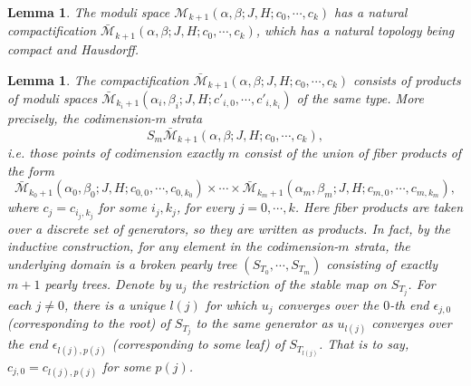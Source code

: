 \documentclass{amsart}
\newtheorem{lemma}[theorem]{Lemma}
\numberwithin{equation}{section}
\numberwithin{figure}{section}
\begin{document}
\begin{lemma}\label{compactness and Hausdorffness}
	The moduli space $\mathcal{M}_{k+1}(\alpha, \beta; J, H; c_{0}, \cdots, c_{k})$ has a natural compactification $\bar{\mathcal{M}}_{k+1}(\alpha, \beta; J, H; c_{0}, \cdots, c_{k})$, which has a natural topology being compact and Hausdorff.
\end{lemma}

\begin{lemma}\label{boundary strata in the moduli space}
	The compactification $\bar{\mathcal{M}}_{k+1}(\alpha, \beta; J, H; c_{0}, \cdots, c_{k})$ consists of products of moduli spaces $\bar{\mathcal{M}}_{k_{i}+1}(\alpha_{i}, \beta_{i}; J, H; c'_{i, 0}, \cdots, c'_{i, k_{i}})$ of the same type. More precisely, the codimension-$m$ strata 
\begin{equation*}
	S_{m}\bar{\mathcal{M}}_{k+1}(\alpha, \beta; J, H; c_{0}, \cdots, c_{k}),
\end{equation*}
i.e. those points of codimension exactly $m$ consist of the union of fiber products of the form 
\begin{equation}\label{boundary strata of moduli space of pearly trees in the form of fiber products}
\bar{\mathcal{M}}_{k_{0}+1}(\alpha_{0}, \beta_{0}; J, H; c_{0, 0}, \cdots, c_{0, k_{0}}) \times \cdots \times \bar{\mathcal{M}}_{k_{m}+1}(\alpha_{m}, \beta_{m}; J, H; c_{m, 0}, \cdots, c_{m, k_{m}}),
\end{equation}
where $c_{j} = c_{i_{j}, k_{j}}$ for some $i_{j}, k_{j}$, for every $j = 0, \cdots, k$. Here fiber products are taken over a discrete set of generators, so they are written as products.
In fact, by the inductive construction, for any element in the codimension-$m$ strata, the underlying domain is a broken pearly tree $(S_{T_{0}}, \cdots, S_{T_{m}})$ consisting of exactly $m+1$ pearly trees. Denote by $u_{j}$ the restriction of the stable map on $S_{T_{j}}$. For each $j \neq 0$, there is a unique $l(j)$ for which $u_{j}$ converges over the $0$-th end $\epsilon_{j, 0}$ (corresponding to the root) of $S_{T_{j}}$ to the same generator as $u_{l(j)}$ converges over the end $\epsilon_{l(j), p(j)}$ (corresponding to some leaf) of $S_{T_{l(j)}}$. That is to say, $c_{j, 0} = c_{l(j), p(j)}$ for some $p(j)$.
\end{lemma}
\end{document}
